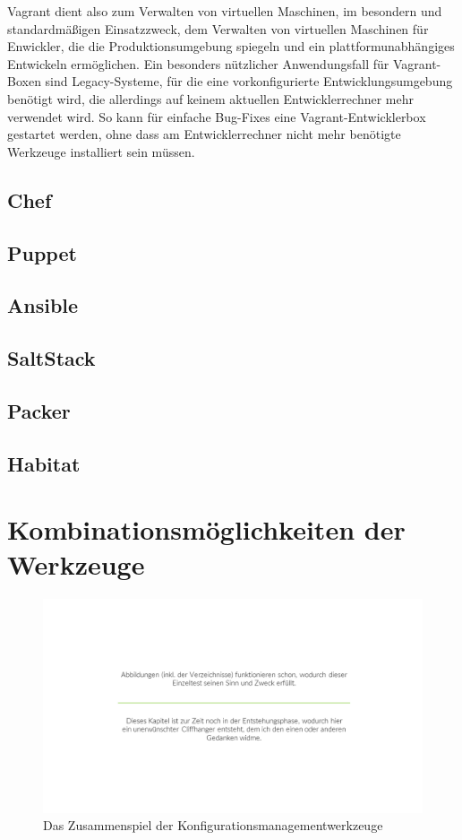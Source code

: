 Vagrant dient also zum Verwalten von virtuellen Maschinen, im besondern und standardmäßigen Einsatzzweck, dem Verwalten von virtuellen Maschinen für Enwickler, die die Produktionsumgebung spiegeln und ein plattformunabhängiges Entwickeln ermöglichen.
Ein besonders nützlicher Anwendungsfall für Vagrant-Boxen sind Legacy-Systeme, für die eine vorkonfigurierte Entwicklungsumgebung benötigt wird, die allerdings auf keinem aktuellen Entwicklerrechner mehr verwendet wird.
So kann für einfache Bug-Fixes eine Vagrant-Entwicklerbox gestartet werden, ohne dass am Entwicklerrechner nicht mehr benötigte Werkzeuge installiert sein müssen.


\subsection{Chef}
\label{sub:chef}

\subsection{Puppet}
\label{sub:puppet}

\subsection{Ansible}
\label{sub:ansible}

\subsection{SaltStack}
\label{sub:saltstack}

\subsection{Packer}
\label{sub:packer}

\subsection{Habitat}
\label{sub:habitat}


\section{Kombinationsmöglichkeiten der Werkzeuge}
\label{sec:werkzeugkombinationsmoeglichkeiten}
\begin{figure}[htbp]
    \centering
    \includegraphics[width=0.9\linewidth,trim=190 160 190 160,clip]{images/cliffhanger}
    \caption{Das Zusammenspiel der Konfigurationsmanagementwerkzeuge}
\label{fig:konfigurationsmanagement-kombinationen}
\end{figure}
